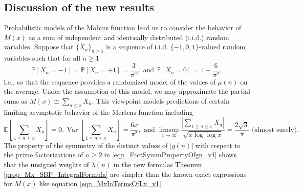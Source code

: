 \documentclass[11pt,reqno,a4letter]{article}
\newcommand{\hlocalref}[1]{\hyperref[#1]{\ref{#1}}}
\numberwithin{equation}{section}
\numberwithin{figure}{section}
\numberwithin{table}{section}
\theoremstyle{plain}
\numberwithin{theorem}{section}
\theoremstyle{definition}
\begin{document}
\subsection{Discussion of the new results}

Probabilistic models of the M\"obius function lead us to consider the behavior of $M(x)$ 
as a sum of independent and identically distributed (i.i.d.) random variables. 
Suppose that $\{X_n\}_{n \geq 1}$ is a sequence of i.i.d. 
$\{-1,0,1\}$-valued random variables 
such that for all $n \geq 1$ 
$$\mathbb{P}[X_n = -1] = \mathbb{P}[X_n = +1] = \frac{3}{\pi^2}, 
  \text{ and } \mathbb{P}[X_n = 0] = 1 - \frac{6}{\pi^2},$$ 
i.e., so that the sequence provides a randomized model of the values of $\mu(n)$ on the average. 
Under the assumption of this model, we may approximate the partial sums as 
$M(x) \cong \sum_{n \leq x} X_n$. 
This viewpoint models predictions of certain limiting asymptotic behavior of the 
Mertens function including 
\[
\mathbb{E}\left[\sum_{1 \leq n \leq x} X_n\right] = 0, 
     \operatorname{Var}\left[\sum_{1 \leq n \leq x} X_n\right] = \frac{6x}{\pi^2}, 
     \text{ and } 
     \limsup_{x \rightarrow \infty} \frac{\left\lvert \sum\limits_{1 \leq n \leq x} X_n 
     \right\rvert}{\sqrt{x \log\log x}} = \frac{2\sqrt{3}}{\pi}
     \text{ (almost surely).} 
\]
The property of the symmetry of the distinct values of $|g(n)|$ with respect to the 
prime factorizations of $n \geq 2$ in \eqref{eqn_FactSymmPropertyOfgn_v1} 
shows that the unsigned weights of $\lambda(n)$ in 
the new formulas Theorem \hlocalref{prop_Mx_SBP_IntegralFormula} 
are simpler than the known 
exact expressions for $M(x)$ like equation \eqref{eqn_MxInTermsOfLx_v1}. 
\end{document}
